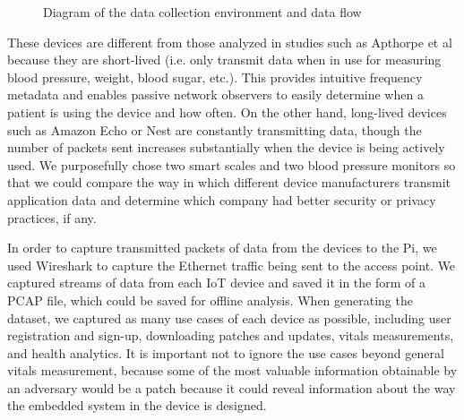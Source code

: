 \begin{figure}
  \caption{Diagram of the data collection environment and data flow}
  \centering
\end{figure}

These devices are different from those analyzed in studies such as Apthorpe et al \cite{apthorpeIoT} because they are short-lived (i.e. only transmit data when in use for measuring blood pressure, weight, blood sugar, etc.). This provides intuitive frequency metadata and enables passive network observers to easily determine when a patient is using the device and how often. On the other hand, long-lived devices such as Amazon Echo or Nest are constantly transmitting data, though the number of packets sent increases substantially when the device is being actively used. We purposefully chose two smart scales and two blood pressure monitors so that we could compare the way in which different device manufacturers transmit application data and determine which company had better security or privacy practices, if any. 

In order to capture transmitted packets of data from the devices to the Pi, we used Wireshark to capture the Ethernet traffic being sent to the access point. We captured streams of data from each IoT device and saved it in the form of a PCAP file, which could be saved for offline analysis. When generating the dataset, we captured as many use cases of each device as possible, including user registration and sign-up, downloading patches and updates, vitals measurements, and health analytics. It is important not to ignore the use cases beyond general vitals measurement, because some of the most valuable information obtainable by an adversary would be a patch because it could reveal information about the way the embedded system in the device is designed. 

